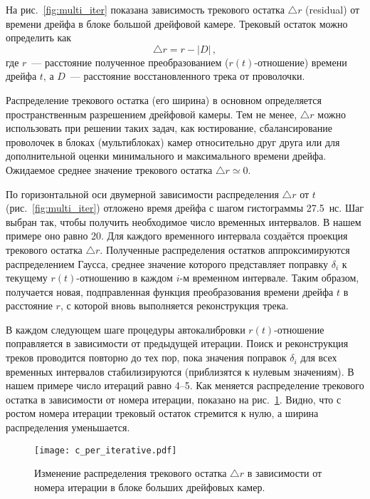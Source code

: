 На рис.~\ref{fig:multi_iter} показана зависимость трекового остатка
$\triangle r$ (residual) от времени дрейфа в блоке большой дрейфовой камере.
Трековый остаток можно определить как
\begin{equation}
  \triangle r = r - |D|\,,
\end{equation}
где $r$~--- расстояние полученное преобразованием ($r(t)$-отношение) времени
дрейфа $t$, а $D$~--- расстояние восстановленного трека от проволочки.

Распределение трекового остатка (его ширина) в основном определяется
пространственным разрешением дрейфовой камеры. Тем не менее, $\triangle r$
можно использовать при решении таких задач, как юстирование, сбалансирование
проволочек в блоках (мультиблоках) камер относительно друг друга или для
дополнительной оценки минимального и максимального времени дрейфа. Ожидаемое
среднее значение трекового остатка $\triangle r \simeq 0$.

По горизонтальной оси двумерной зависимости распределения $\triangle r$ от $t$
(рис.~\ref{fig:multi_iter}) отложено время дрейфа с шагом гистограммы 27.5~нс.
Шаг выбран так, чтобы получить необходимое число временных интервалов. В нашем
примере оно равно 20. Для каждого временного интервала создаётся проекция
трекового остатка $\triangle r$. Полученные распределения остатков
аппроксимируются распределением Гаусса, среднее значение которого представляет
поправку $\delta_i$ к текущему $r(t)$-отношению в каждом $i$-м временном
интервале. Таким образом, получается новая, подправленная функция преобразования
времени дрейфа $t$ в расстояние $r$, с которой вновь выполняется реконструкция
трека.

В каждом следующем шаге процедуры автокалибровки $r(t)$-отно\-шение поправляется
в зависимости от предыдущей итерации. Поиск и реконструкция треков проводится
повторно до тех пор, пока значения поправок $\delta_i$ для всех временных
интервалов стабилизируются (приблизятся к нулевым значениям). В нашем примере
число итераций равно 4--5. Как меняется распределение трекового остатка в
зависимости от номера итерации, показано на рис.~\ref{fig:per_iterative}.
Видно, что с ростом номера итерации трековый остаток стремится к нулю, а ширина
распределения уменьшается.

\begin{figure}[h]
  \centering
  \texttt{[image: c\_per\_iterative.pdf]}
  \caption{Изменение распределения трекового остатка $\triangle r$ в зависимости
    от номера итерации в блоке больших дрейфовых камер.}
  \label{fig:per_iterative}
\end{figure}

